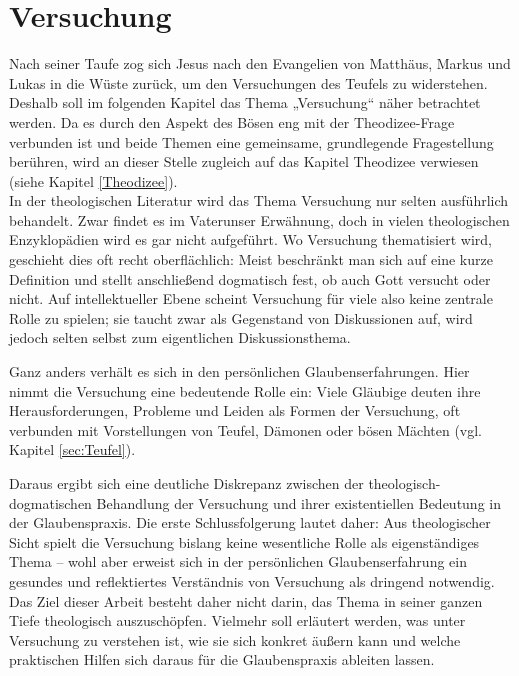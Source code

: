\chapter{Versuchung} \label{Versuchung}
Nach seiner Taufe zog sich Jesus nach den Evangelien von Matthäus, Markus und Lukas in die Wüste zurück, um den Versuchungen des Teufels zu widerstehen. Deshalb soll im folgenden Kapitel das Thema „Versuchung“ näher betrachtet werden. Da es durch den Aspekt des Bösen eng mit der Theodizee-Frage verbunden ist und beide Themen eine gemeinsame, grundlegende Fragestellung berühren, wird an dieser Stelle zugleich auf das Kapitel Theodizee verwiesen (siehe Kapitel \ref{Theodizee}).\\

In der theologischen Literatur wird das Thema Versuchung nur selten ausführlich behandelt. Zwar findet es im Vaterunser Erwähnung, doch in vielen theologischen Enzyklopädien wird es gar nicht aufgeführt. Wo Versuchung thematisiert wird, geschieht dies oft recht oberflächlich: Meist beschränkt man sich auf eine kurze Definition und stellt anschließend dogmatisch fest, ob auch Gott versucht oder nicht. Auf intellektueller Ebene scheint Versuchung für viele also keine zentrale Rolle zu spielen; sie taucht zwar als Gegenstand von Diskussionen auf, wird jedoch selten selbst zum eigentlichen Diskussionsthema.\

Ganz anders verhält es sich in den persönlichen Glaubenserfahrungen. Hier nimmt die Versuchung eine bedeutende Rolle ein: Viele Gläubige deuten ihre Herausforderungen, Probleme und Leiden als Formen der Versuchung, oft verbunden mit Vorstellungen von Teufel, Dämonen oder bösen Mächten (vgl. Kapitel \ref{sec:Teufel}).\

Daraus ergibt sich eine deutliche Diskrepanz zwischen der theologisch-dogmatischen Behandlung der Versuchung und ihrer existentiellen Bedeutung in der Glaubenspraxis. Die erste Schlussfolgerung lautet daher: Aus theologischer Sicht spielt die Versuchung bislang keine wesentliche Rolle als eigenständiges Thema – wohl aber erweist sich in der persönlichen Glaubenserfahrung ein gesundes und reflektiertes Verständnis von Versuchung als dringend notwendig.\\

Das Ziel dieser Arbeit besteht daher nicht darin, das Thema in seiner ganzen Tiefe theologisch auszuschöpfen. Vielmehr soll erläutert werden, was unter Versuchung zu verstehen ist, wie sie sich konkret äußern kann und welche praktischen Hilfen sich daraus für die Glaubenspraxis ableiten lassen. \\

